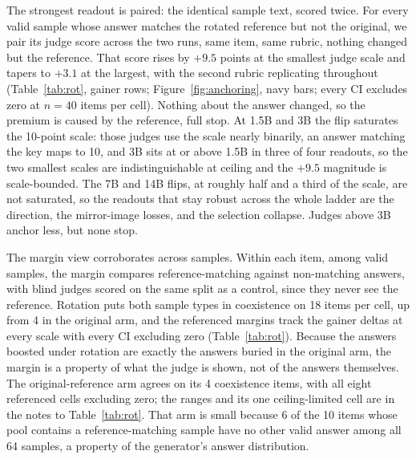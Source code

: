 \documentclass[11pt]{article}
\begin{document}
The strongest readout is paired: the identical sample text, scored twice.
For every valid sample whose answer matches the rotated reference but not the original, we pair its judge score across the two runs, same item, same rubric, nothing changed but the reference.
That score rises by $+9.5$ points at the smallest judge scale and tapers to $+3.1$ at the largest, with the second rubric replicating throughout (Table~\ref{tab:rot}, gainer rows; Figure~\ref{fig:anchoring}, navy bars; every CI excludes zero at $n{=}40$ items per cell).
Nothing about the answer changed, so the premium is caused by the reference, full stop.
At 1.5B and 3B the flip saturates the 10-point scale: those judges use the scale nearly binarily, an answer matching the key maps to 10, and 3B sits at or above 1.5B in three of four readouts, so the two smallest scales are indistinguishable at ceiling and the $+9.5$ magnitude is scale-bounded.
The 7B and 14B flips, at roughly half and a third of the scale, are not saturated, so the readouts that stay robust across the whole ladder are the direction, the mirror-image losses, and the selection collapse.
Judges above 3B anchor less, but none stop.

The margin view corroborates across samples.
Within each item, among valid samples, the margin compares reference-matching against non-matching answers, with blind judges scored on the same split as a control, since they never see the reference.
Rotation puts both sample types in coexistence on 18 items per cell, up from 4 in the original arm, and the referenced margins track the gainer deltas at every scale with every CI excluding zero (Table~\ref{tab:rot}).
Because the answers boosted under rotation are exactly the answers buried in the original arm, the margin is a property of what the judge is shown, not of the answers themselves.
The original-reference arm agrees on its 4 coexistence items, with all eight referenced cells excluding zero; the ranges and its one ceiling-limited cell are in the notes to Table~\ref{tab:rot}.
That arm is small because 6 of the 10 items whose pool contains a reference-matching sample have no other valid answer among all 64 samples, a property of the generator's answer distribution.
\end{document}
